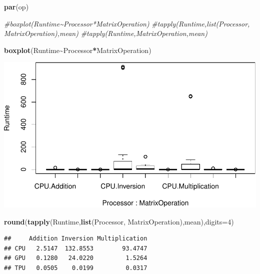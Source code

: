 \documentclass[
]{article}
\newenvironment{Shaded}{\begin{snugshade}}{\end{snugshade}}
\newcommand{\CommentTok}[1]{\textcolor[rgb]{0.56,0.35,0.01}{\textit{#1}}}
\newcommand{\DataTypeTok}[1]{\textcolor[rgb]{0.13,0.29,0.53}{#1}}
\newcommand{\DecValTok}[1]{\textcolor[rgb]{0.00,0.00,0.81}{#1}}
\newcommand{\KeywordTok}[1]{\textcolor[rgb]{0.13,0.29,0.53}{\textbf{#1}}}
\newcommand{\NormalTok}[1]{#1}
\newcommand{\OperatorTok}[1]{\textcolor[rgb]{0.81,0.36,0.00}{\textbf{#1}}}
\begin{document}
\begin{Shaded}
\begin{Highlighting}[]
\KeywordTok{par}\NormalTok{(op)}

\CommentTok{\#boxplot(Runtime\textasciitilde{}Processor*MatrixOperation)}
\CommentTok{\#tapply(Runtime,list(Processor, MatrixOperation),mean)}
\CommentTok{\#tapply(Runtime,MatrixOperation,mean)}

\KeywordTok{boxplot}\NormalTok{(Runtime}\OperatorTok{\textasciitilde{}}\NormalTok{Processor}\OperatorTok{*}\NormalTok{MatrixOperation)}
\end{Highlighting}
\end{Shaded}

\includegraphics{main_files/figure-latex/prepare data-4.pdf}

\begin{Shaded}
\begin{Highlighting}[]
\KeywordTok{round}\NormalTok{(}\KeywordTok{tapply}\NormalTok{(Runtime,}\KeywordTok{list}\NormalTok{(Processor, MatrixOperation),mean),}\DataTypeTok{digits=}\DecValTok{4}\NormalTok{)}
\end{Highlighting}
\end{Shaded}

\begin{verbatim}
##     Addition Inversion Multiplication
## CPU   2.5147  132.8553        93.4747
## GPU   0.1280   24.0220         1.5264
## TPU   0.0505    0.0199         0.0317
\end{verbatim}
\end{document}
